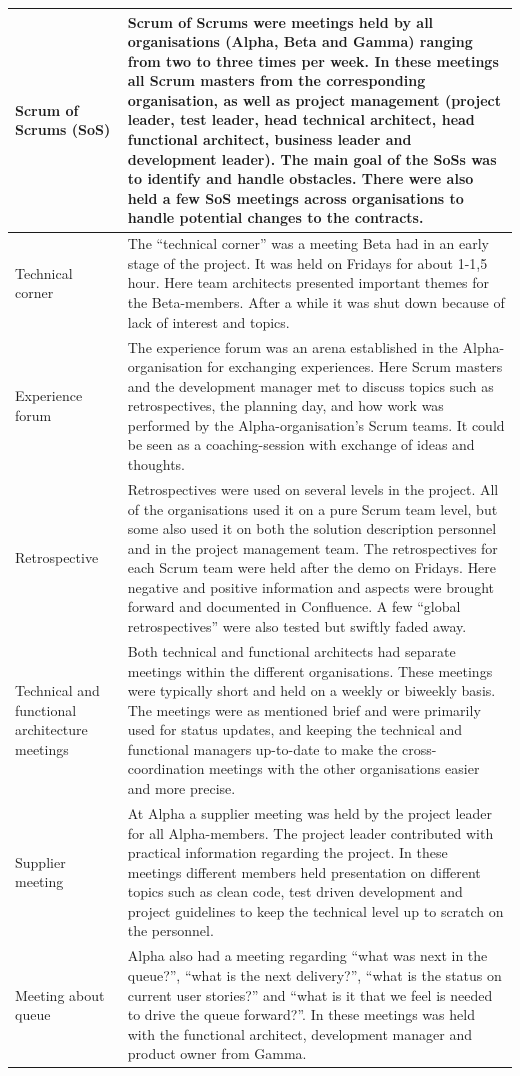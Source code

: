 \begin{center}
\begin{longtable}{| p{6cm} | p{9cm} |}
    Scrum of Scrums (SoS) & Scrum of Scrums were meetings held by all organisations (Alpha, Beta and Gamma) ranging from two to three times per week. In these meetings all Scrum masters from the corresponding organisation, as well as project management (project leader, test leader, head technical architect, head functional architect, business leader and development leader). The main goal of the SoSs was to identify and handle obstacles. There were also held a few SoS meetings across organisations to handle potential changes to the contracts. \\ \hline
    Technical corner & The ``technical corner'' was a meeting Beta had in an early stage of the project. It was held on Fridays for about 1-1,5 hour. Here team architects presented important themes for the Beta-members. After a while it was shut down because of lack of interest and topics. \\ \hline
    Experience forum & The experience forum was an arena established in the Alpha-organisation for exchanging experiences. Here Scrum masters and the development manager met to discuss topics such as retrospectives, the planning day, and how work was performed by the Alpha-organisation's Scrum teams. It could be seen as a coaching-session with exchange of ideas and thoughts. \\ \hline
    Retrospective & Retrospectives were used on several levels in the project. All of the organisations used it on a pure Scrum team level, but some also used it on both the solution description personnel and in the project management team. The retrospectives for each Scrum team were held after the demo on Fridays. Here negative and positive information and aspects were brought forward and documented in Confluence. A few ``global retrospectives'' were also tested but swiftly faded away. \\ \hline
    Technical and functional architecture meetings & Both technical and functional architects had separate meetings within the different organisations. These meetings were typically short and held on a weekly or biweekly basis. The meetings were as mentioned brief and were primarily used for status updates, and keeping the technical and functional managers up-to-date to make the cross-coordination meetings with the other organisations easier and more precise. \\ \hline
    Supplier meeting & At Alpha a supplier meeting was held by the project leader for all Alpha-members. The project leader contributed with practical information regarding the project. In these meetings different members held presentation on different topics such as clean code, test driven development and project guidelines to keep the technical level up to scratch on the personnel. \\ \hline
    Meeting about queue & Alpha also had a meeting regarding ``what was next in the queue?'', ``what is the next delivery?'', ``what is the status on current user stories?'' and ``what is it that we feel is needed to drive the queue forward?''. In these meetings was held with the functional architect, development manager and product owner from Gamma. \\ \hline


\end{longtable}
\end{center}
